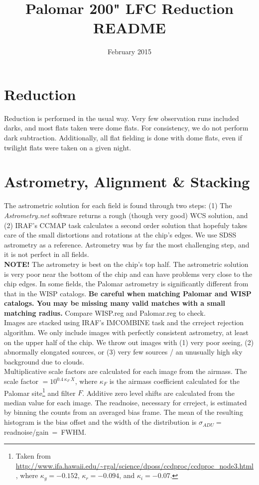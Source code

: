 \documentclass{article}
\title{Palomar 200" LFC Reduction README}
\author{February 2015}
\date{}
\begin{document}
\maketitle

\section{Reduction}
Reduction is performed in the usual way. Very few observation runs 
included darks, and most flats taken were dome flats. For consistency, 
we do not perform dark subtraction. Additionally, all flat fielding is done 
with dome flats, even if twilight flats were taken on a given night.

\section{Astrometry, Alignment \& Stacking}
The astrometric solution for each field is found through two steps:
(1) The \textit{Astrometry.net} software returns a rough 
(though very good) WCS solution, and (2) IRAF's CCMAP task calculates
a second order solution that hopefuly takes care of the small distortions
and rotations at the chip's edges. We use SDSS astrometry as a reference.
Astrometry was by far the most challenging
step, and it is not perfect in all fields.\\

\noindent \textbf{NOTE!} The astrometry is best on the chip's top half. 
The astrometric solution is very poor near the bottom of the chip
and can have problems very close to the chip edges. In some fields, 
the Palomar astrometry is significantly different from that in the 
WISP catalogs.
\textbf{Be careful when matching Palomar and WISP catalogs. You may
be missing many valid matches with a small matching radius.} 
Compare WISP.reg and Palomar.reg to check. \\

\noindent Images are stacked using IRAF's IMCOMBINE task and the 
crreject rejection algorithm. 
We only include images 
with perfectly consistent astrometry, at least on the upper half of the chip.
We throw out images with (1) very poor seeing, (2) abnormally elongated 
sources, or (3) very few sources / 
an unusually high sky background due to clouds. \\

\noindent Multiplicative scale factors are calculated for each image
from the airmass. 
The scale factor $=10^{0.4 ~ \kappa_F~ X}$, where $\kappa_F$ is the airmass 
coefficient calculated for the Palomar site\footnote{Taken from 
\url{http://www.ifa.hawaii.edu/~rgal/science/dposs/ccdproc/ccdproc\_node3.html},
where $\kappa_g = -0.152$, $\kappa_r=-0.094$, and $\kappa_i=-0.07$.} 
and filter $F$.
Additive zero level shifts are calculated from the median value for 
each image. 
The readnoise, necessary for crreject,
is estimated by binning the counts from an averaged bias frame. The
mean of the resulting histogram is the bias offset and 
the width of the distribution is $\sigma_{ADU} =~$readnoise/gain$~=~$FWHM.\\
\end{document}
